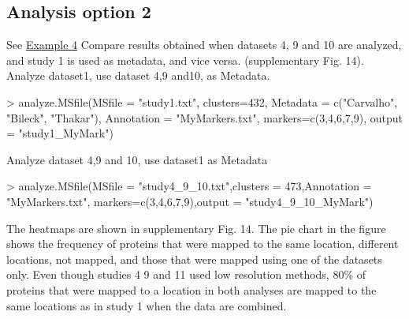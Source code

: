 \documentclass[a4paper]{article}
\numberwithin{equation}{subsection}
\begin{document}
\subsection{Analysis option 2}
\label{opt2}
See \hyperref[ex4]{Example 4}
Compare results obtained when datasets 4, 9 and 10 are analyzed, and
study 1 is used as metadata, and vice versa.  (supplementary
Fig. 14). Analyze dataset1, use dataset 4,9 and10, as Metadata.
\scriptsize
\begin{Schunk}
\begin{Sinput}
> analyze.MSfile(MSfile = "study1.txt", clusters=432, Metadata = c("Carvalho", "Bileck", "Thakar"), Annotation = "MyMarkers.txt", markers=c(3,4,6,7,9), output = "study1_MyMark")
\end{Sinput}
\end{Schunk}
\normalsize
Analyze dataset 4,9 and 10, use dataset1 as Metadata
\scriptsize
\begin{Schunk}
\begin{Sinput}
> analyze.MSfile(MSfile = "study4_9_10.txt",clusters = 473,Annotation = "MyMarkers.txt", markers=c(3,4,6,7,9),output = "study4_9_10_MyMark")
\end{Sinput}
\end{Schunk}
\normalsize

The heatmaps are shown in supplementary Fig. 14. The pie chart in the figure shows the frequency of proteins that were mapped to the same location, different locations, not mapped, and those that were mapped using one of the datasets only. Even though studies 4 9 and 11 used low resolution methods, 80\% of proteins that were mapped to a location in both analyses are mapped to the same locations as in study 1 when the data are combined.
\end{document}
